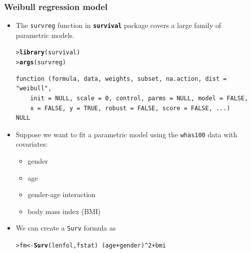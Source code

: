\documentclass[10pt]{beamer}\usepackage[]{graphicx}\usepackage[]{color}
\makeatletter
\newcommand{\hlnum}[1]{\textcolor[rgb]{0.686,0.059,0.569}{#1}}%
\newcommand{\hlopt}[1]{\textcolor[rgb]{0,0,0}{#1}}%
\newcommand{\hlstd}[1]{\textcolor[rgb]{0.345,0.345,0.345}{#1}}%
\newcommand{\hlkwb}[1]{\textcolor[rgb]{0.69,0.353,0.396}{#1}}%
\newcommand{\hlkwd}[1]{\textcolor[rgb]{0.737,0.353,0.396}{\textbf{#1}}}%
\newenvironment{kframe}{%
 \def\at@end@of@kframe{}%
 \ifinner\ifhmode%
  \def\at@end@of@kframe{\end{minipage}}%
  \begin{minipage}{\columnwidth}%
 \fi\fi%
 \def\FrameCommand##1{\hskip\@totalleftmargin \hskip-\fboxsep
 \colorbox{shadecolor}{##1}\hskip-\fboxsep
     \hskip-\linewidth \hskip-\@totalleftmargin \hskip\columnwidth}%
 \MakeFramed {\advance\hsize-\width
   \@totalleftmargin\z@ \linewidth\hsize
   \@setminipage}}%
 {\par\unskip\endMakeFramed%
 \at@end@of@kframe}
\newenvironment{knitrout}{}{} %
\renewenvironment{knitrout}{\setlength{\topsep}{-.2mm}}{}
\newcommand{\pkg}[1]{{\textbf{\texttt{#1}}}}
\newcommand{\code}[1]{{\texttt{#1}}}
\makeatother
\begin{document}
\begin{frame}[fragile]
  \frametitle{Weibull regression model}
  \begin{itemize}
  \item The \code{survreg} function in \pkg{survival} package
    covers a large family of parametric models.
\begin{knitrout}\scriptsize
{}\color{fgcolor}\begin{kframe}
\begin{alltt}
\hlstd{> }\hlkwd{library}\hlstd{(survival)}
\hlstd{> }\hlkwd{args}\hlstd{(survreg)}
\end{alltt}
\begin{verbatim}
function (formula, data, weights, subset, na.action, dist = "weibull", 
    init = NULL, scale = 0, control, parms = NULL, model = FALSE, 
    x = FALSE, y = TRUE, robust = FALSE, score = FALSE, ...) 
NULL
\end{verbatim}
\end{kframe}
\end{knitrout}
  \item Suppose we want to fit a parametric model using the \code{whas100} data with covariates:
    \begin{itemize}
    \item gender
    \item age
    \item gender-age interaction
    \item  body mass index (BMI)
    \end{itemize}
  \item We can create a \code{Surv} formula as
\begin{knitrout}\scriptsize
{}\color{fgcolor}\begin{kframe}
\begin{alltt}
\hlstd{> }\hlstd{fm} \hlkwb{<-} \hlkwd{Surv}\hlstd{(lenfol, fstat)} \hlopt{~} \hlstd{(age} \hlopt{+} \hlstd{gender)}\hlopt{^}\hlnum{2} \hlopt{+} \hlstd{bmi}
\end{alltt}
\end{kframe}
\end{knitrout}
\end{itemize}
\end{frame}
\end{document}
